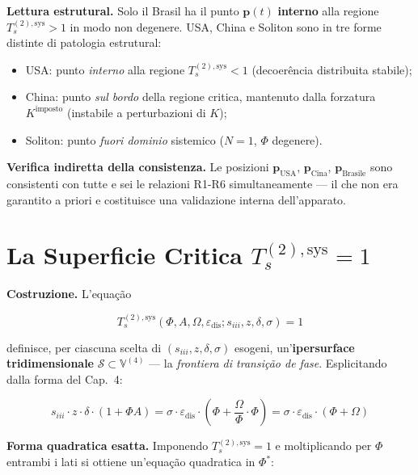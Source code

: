 \Hypoth{} \textbf{Lettura estrutural.} Solo il Brasil ha il punto
\(\boldsymbol{p}(t)\) \textbf{interno} alla regione
\(T_s^{(2),\text{sys}} > 1\) in modo non degenere. USA, China e Soliton
sono in tre forme distinte di patologia estrutural:

\begin{itemize}
\tightlist
\item
  USA: punto \emph{interno} alla regione \(T_s^{(2),\text{sys}} < 1\)
  (decoerência distribuita stabile);
\item
  China: punto \emph{sul bordo} della regione critica, mantenuto dalla
  forzatura \(K^{\text{imposto}}\) (instabile a perturbazioni di \(K\));
\item
  Soliton: punto \emph{fuori dominio} sistemico (\(N=1\), \(\Phi\)
  degenere).
\end{itemize}

\Proved{} \textbf{Verifica indiretta della consistenza.} Le posizioni
\(\boldsymbol{p}_{\text{USA}}\), \(\boldsymbol{p}_{\text{Cina}}\),
\(\boldsymbol{p}_{\text{Brasile}}\) sono consistenti con tutte e sei le
relazioni R1-R6 simultaneamente --- il che non era garantito a priori e
costituisce una validazione interna dell'apparato.



\section{\texorpdfstring{La Superficie Critica
\(T_s^{(2),\text{sys}} = 1\)}{La Superficie Critica T\_s\^{}\{(2),\textbackslash text\{sys\}\} = 1}}\label{la-superficie-critica-t_s2textsys-1}

\Hypoth{} \textbf{Costruzione.} L'equação

\[
T_s^{(2),\text{sys}}(\Phi, A, \Omega, \varepsilon_{\text{dis}}; s_{iii}, z, \delta, \sigma) = 1
\]

definisce, per ciascuna scelta di \((s_{iii}, z, \delta, \sigma)\)
esogeni, un'\textbf{ipersurface tridimensionale}
\(\mathcal{S} \subset \mathbb{V}^{(4)}\) --- la \emph{frontiera di
transição de fase}. Esplicitando dalla forma del Cap.~4:

\[
s_{iii} \cdot z \cdot \delta \cdot (1 + \Phi A) = \sigma \cdot \varepsilon_{\text{dis}} \cdot \left(\Phi + \frac{\Omega}{\Phi} \cdot \Phi\right) = \sigma \cdot \varepsilon_{\text{dis}} \cdot (\Phi + \Omega)
\]

\Hypoth{} \textbf{Forma quadratica esatta.} Imponendo
\(T_s^{(2),\text{sys}} = 1\) e moltiplicando per \(\Phi\) entrambi i
lati si ottiene un'equação quadratica in \(\Phi^*\):

